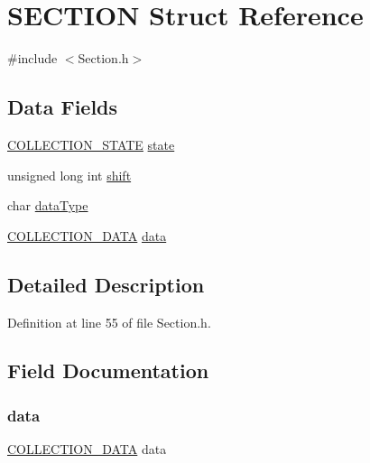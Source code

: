 \hypertarget{struct_s_e_c_t_i_o_n}{}\section{S\+E\+C\+T\+I\+ON Struct Reference}
\label{struct_s_e_c_t_i_o_n}


{\ttfamily \#include $<$Section.\+h$>$}

\subsection*{Data Fields}
\begin{DoxyCompactItemize}
\item 
\mbox{\hyperlink{_f_s_m_collection_8h_a1ffa02d402e882e4716ee5d2884de8a8}{C\+O\+L\+L\+E\+C\+T\+I\+O\+N\+\_\+\+S\+T\+A\+TE}} \mbox{\hyperlink{struct_s_e_c_t_i_o_n_a08d4030412839135534c1446ea4b22ea}{state}}
\item 
unsigned long int \mbox{\hyperlink{struct_s_e_c_t_i_o_n_a2eb484bf0333898743ffbcc21e2ee118}{shift}}
\item 
char \mbox{\hyperlink{struct_s_e_c_t_i_o_n_a03166a9dfad889de78a15a51d04851b5}{data\+Type}}
\item 
\mbox{\hyperlink{union_c_o_l_l_e_c_t_i_o_n___d_a_t_a}{C\+O\+L\+L\+E\+C\+T\+I\+O\+N\+\_\+\+D\+A\+TA}} \mbox{\hyperlink{struct_s_e_c_t_i_o_n_a617c730fb14b164ba05002ba9b052275}{data}}
\end{DoxyCompactItemize}


\subsection{Detailed Description}


Definition at line 55 of file Section.\+h.



\subsection{Field Documentation}
\mbox{\label{struct_s_e_c_t_i_o_n_a617c730fb14b164ba05002ba9b052275}} 
\subsubsection{\texorpdfstring{data}{data}}
{\footnotesize\ttfamily \mbox{\hyperlink{union_c_o_l_l_e_c_t_i_o_n___d_a_t_a}{C\+O\+L\+L\+E\+C\+T\+I\+O\+N\+\_\+\+D\+A\+TA}} data}



